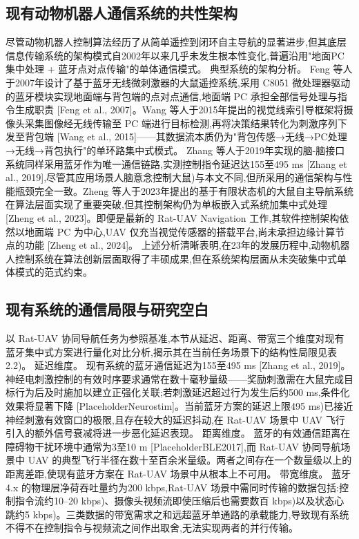 \subsection{现有动物机器人通信系统的共性架构}
尽管动物机器人控制算法经历了从简单遥控到闭环自主导航的显著进步,但其底层信息传输系统的架构模式自2002年以来几乎未发生根本性变化,普遍沿用"地面PC集中处理 + 蓝牙点对点传输"的单体通信模式。
典型系统的架构分析。 Feng 等人于2007年设计了基于蓝牙无线微刺激器的大鼠遥控系统,采用 C8051 微处理器驱动的蓝牙模块实现地面端与背包端的点对点通信,地面端 PC 承担全部信号处理与指令生成职责 [Feng et al., 2007]。Wang 等人于2015年提出的视觉线索引导框架将摄像头采集图像经无线传输至 PC 端进行目标检测,再将决策结果转化为刺激序列下发至背包端 [Wang et al., 2015]——其数据流本质仍为"背包传感→无线→PC处理→无线→背包执行"的单环路集中式模式。
Zhang 等人于2019年实现的脑-脑接口系统同样采用蓝牙作为唯一通信链路,实测控制指令延迟达155至495 ms [Zhang et al., 2019],尽管其应用场景人脑意念控制大鼠)与本文不同,但所采用的通信架构与性能瓶颈完全一致。Zheng 等人于2023年提出的基于有限状态机的大鼠自主导航系统在算法层面实现了重要突破,但其控制架构仍为单板嵌入式系统加集中式处理 [Zheng et al., 2023]。即便是最新的 Rat-UAV Navigation 工作,其软件控制架构依然以地面端 PC 为中心,UAV 仅充当视觉传感器的搭载平台,尚未承担边缘计算节点的功能 [Zheng et al., 2024]。
上述分析清晰表明,在23年的发展历程中,动物机器人控制系统在算法创新层面取得了丰硕成果,但在系统架构层面从未突破集中式单体模式的范式约束。

\subsection{现有系统的通信局限与研究空白}
以 Rat-UAV 协同导航任务为参照基准,本节从延迟、距离、带宽三个维度对现有蓝牙集中式方案进行量化对比分析,揭示其在当前任务场景下的结构性局限见表2.2)。
延迟维度。 现有系统的蓝牙通信延迟为155至495 ms [Zhang et al., 2019]。神经电刺激控制的有效时序要求通常在数十毫秒量级——奖励刺激需在大鼠完成目标行为后及时施加以建立正强化关联;若刺激延迟超过行为发生后约500 ms,条件化效果将显著下降 [PlaceholderNeurostim]。当前蓝牙方案的延迟上限495 ms)已接近神经刺激有效窗口的极限,且存在较大的延迟抖动,在 Rat-UAV 场景中 UAV 飞行引入的额外信号衰减将进一步恶化延迟表现。
距离维度。 蓝牙的有效通信距离在障碍物干扰环境中通常为3至10 m [PlaceholderBLE2017],而 Rat-UAV 协同导航场景中 UAV 的典型飞行半径在数十至百余米量级。两者之间存在一个数量级以上的距离差距,使现有蓝牙方案在 Rat-UAV 场景中从根本上不可用。
带宽维度。 蓝牙4.x 的物理层净荷吞吐量约为200 kbps,Rat-UAV 场景中需同时传输的数据包括:控制指令流约10–20 kbps)、摄像头视频流即使压缩后也需要数百 kbps)以及状态心跳约5 kbps)。三类数据的带宽需求之和远超蓝牙单通路的承载能力,导致现有系统不得不在控制指令与视频流之间作出取舍,无法实现两者的并行传输。

